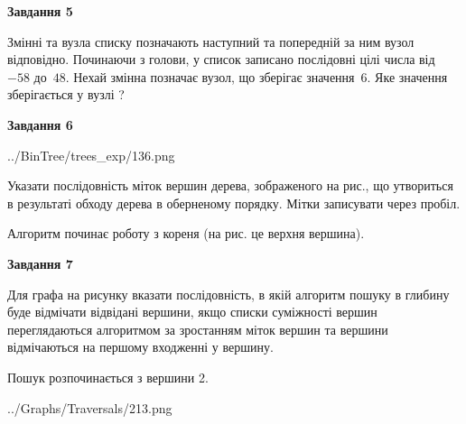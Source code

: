 \documentclass[12pt, ukrainian]{article}
\begin{document}
{\begin {large}
{\begin {center}\textbf{Завдання 5}\end {center}}\par
Змінні  та  вузла списку позначають наступний та попередній за ним вузол відповідно. Починаючи з голови, у список записано послідовні цілі числа від~$-58$ до~$48$. Нехай змінна  позначає вузол, що зберігає значення~$6$.
Яке значення зберігається у вузлі  ?\par
\newpage

{\begin {center}\textbf{Завдання 6}\end {center}}\par

\begin{center}
	{../BinTree/trees_exp/136.png}
\end{center}
Указати послідовність міток вершин дерева, зображеного на рис., що утвориться в результаті обходу дерева в оберненому порядку. Мітки записувати через пробіл.\par Алгоритм починає роботу з кореня (на рис. це верхня вершина).\par
\newpage

{\begin {center}\textbf{Завдання 7}\end {center}}\par
Для графа на рисунку вказати послідовність, в якій алгоритм пошуку в глибину буде відмічати відвідані вершини, якщо списки суміжності вершин переглядаються алгоритмом за зростанням міток вершин та вершини відмічаються на першому вход\-женні у вершину.\par
Пошук розпочинається з вершини 2.\par

\begin{center}
	{../Graphs/Traversals/213.png}
\end{center}\par
\newpage


\end{large}}
\end{document}
